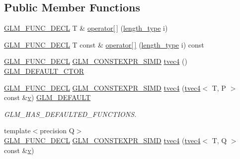 \subsection*{Public Member Functions}
\begin{DoxyCompactItemize}
\item 
\mbox{\hyperlink{setup_8hpp_ab2d052de21a70539923e9bcbf6e83a51}{G\+L\+M\+\_\+\+F\+U\+N\+C\+\_\+\+D\+E\+CL}} T \& \mbox{\hyperlink{structglm_1_1tvec4_a036a73844fb59380b1149744e1ddd2b2}{operator\mbox{[}$\,$\mbox{]}}} (\mbox{\hyperlink{structglm_1_1tvec4_a4e2b34a427cac7e72b6f73173c206feb}{length\+\_\+type}} i)
\item 
\mbox{\hyperlink{setup_8hpp_ab2d052de21a70539923e9bcbf6e83a51}{G\+L\+M\+\_\+\+F\+U\+N\+C\+\_\+\+D\+E\+CL}} T const  \& \mbox{\hyperlink{structglm_1_1tvec4_a60e973c729bf1808c343905ea3208148}{operator\mbox{[}$\,$\mbox{]}}} (\mbox{\hyperlink{structglm_1_1tvec4_a4e2b34a427cac7e72b6f73173c206feb}{length\+\_\+type}} i) const
\item 
\mbox{\hyperlink{setup_8hpp_ab2d052de21a70539923e9bcbf6e83a51}{G\+L\+M\+\_\+\+F\+U\+N\+C\+\_\+\+D\+E\+CL}} \mbox{\hyperlink{setup_8hpp_ae5de828d10226b21e2123dd61f3cb5ed}{G\+L\+M\+\_\+\+C\+O\+N\+S\+T\+E\+X\+P\+R\+\_\+\+S\+I\+MD}} \mbox{\hyperlink{structglm_1_1tvec4_a3a433743d24c5741c68f7d7f0bcdb427}{tvec4}} () \mbox{\hyperlink{setup_8hpp_afb97a4e995bc004c0cbbfa22125b80ba}{G\+L\+M\+\_\+\+D\+E\+F\+A\+U\+L\+T\+\_\+\+C\+T\+OR}}
\item 
\mbox{\hyperlink{setup_8hpp_ab2d052de21a70539923e9bcbf6e83a51}{G\+L\+M\+\_\+\+F\+U\+N\+C\+\_\+\+D\+E\+CL}} \mbox{\hyperlink{setup_8hpp_ae5de828d10226b21e2123dd61f3cb5ed}{G\+L\+M\+\_\+\+C\+O\+N\+S\+T\+E\+X\+P\+R\+\_\+\+S\+I\+MD}} \mbox{\hyperlink{structglm_1_1tvec4_a63f627d6a023b26259e749afc7253f2c}{tvec4}} (\mbox{\hyperlink{structglm_1_1tvec4}{tvec4}}$<$ T, P $>$ const \&\mbox{\hyperlink{glad_8h_a14cfbe2fc2234f5504618905b69d1e06}{v}}) \mbox{\hyperlink{setup_8hpp_aefce7051c376a64ba89fa93a9f63bc2c}{G\+L\+M\+\_\+\+D\+E\+F\+A\+U\+LT}}
\begin{DoxyCompactList}\small\item\em G\+L\+M\+\_\+\+H\+A\+S\+\_\+\+D\+E\+F\+A\+U\+L\+T\+E\+D\+\_\+\+F\+U\+N\+C\+T\+I\+O\+NS. \end{DoxyCompactList}\item 
{\footnotesize template$<$precision Q$>$ }\\\mbox{\hyperlink{setup_8hpp_ab2d052de21a70539923e9bcbf6e83a51}{G\+L\+M\+\_\+\+F\+U\+N\+C\+\_\+\+D\+E\+CL}} \mbox{\hyperlink{setup_8hpp_ae5de828d10226b21e2123dd61f3cb5ed}{G\+L\+M\+\_\+\+C\+O\+N\+S\+T\+E\+X\+P\+R\+\_\+\+S\+I\+MD}} \mbox{\hyperlink{structglm_1_1tvec4_aa2e87b9ff21cb646a4c0ca4c848c7570}{tvec4}} (\mbox{\hyperlink{structglm_1_1tvec4}{tvec4}}$<$ T, Q $>$ const \&\mbox{\hyperlink{glad_8h_a14cfbe2fc2234f5504618905b69d1e06}{v}})

\end{DoxyCompactItemize}
